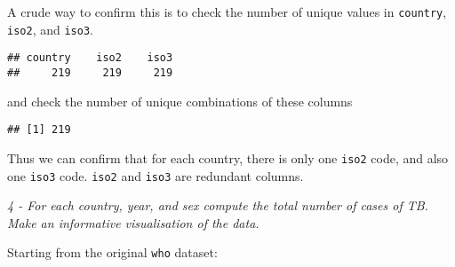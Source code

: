 \documentclass[]{article}
\newenvironment{Shaded}{\begin{snugshade}}{\end{snugshade}}
\newcommand{\KeywordTok}[1]{\textcolor[rgb]{0.13,0.29,0.53}{\textbf{#1}}}
\newcommand{\DecValTok}[1]{\textcolor[rgb]{0.00,0.00,0.81}{#1}}
\newcommand{\StringTok}[1]{\textcolor[rgb]{0.31,0.60,0.02}{#1}}
\newcommand{\ControlFlowTok}[1]{\textcolor[rgb]{0.13,0.29,0.53}{\textbf{#1}}}
\newcommand{\OperatorTok}[1]{\textcolor[rgb]{0.81,0.36,0.00}{\textbf{#1}}}
\newcommand{\NormalTok}[1]{#1}
\theoremstyle{definition}
\theoremstyle{definition}
\theoremstyle{definition}
\theoremstyle{remark}
\begin{document}
A crude way to confirm this is to check the number of unique values in
\texttt{country}, \texttt{iso2}, and \texttt{iso3}.

\begin{Shaded}
\end{Shaded}

\begin{verbatim}
## country    iso2    iso3 
##     219     219     219
\end{verbatim}

and check the number of unique combinations of these columns

\begin{Shaded}
\end{Shaded}

\begin{verbatim}
## [1] 219
\end{verbatim}

Thus we can confirm that for each country, there is only one
\texttt{iso2} code, and also one \texttt{iso3} code. \texttt{iso2} and
\texttt{iso3} are redundant columns.

\emph{4 - For each country, year, and sex compute the total number of
cases of TB. Make an informative visualisation of the data.}

Starting from the original \texttt{who} dataset:
\end{document}
